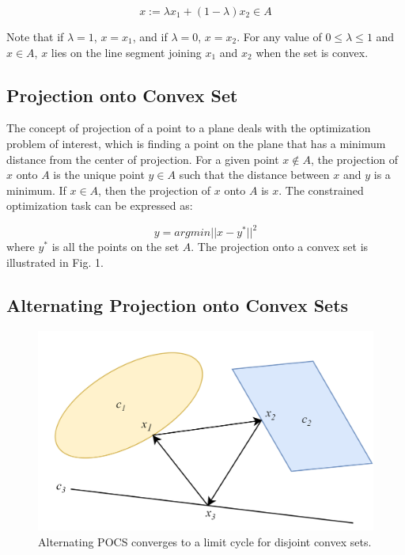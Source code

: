 \documentclass[conference]{IEEEtran}
\begin{document}
\begin{equation}
x := \lambda x_1 + (1 - \lambda)x_2 \in A  \label{eq1}
\end{equation}

Note that if $\lambda = 1$, $x = x_1$, and if $\lambda = 0$, $x = x_2$. For any value of $0 \leq \lambda \leq 1$ and $ x \in A $, $x$ lies on the line segment joining $x_1$ and $x_2$ when the set is convex.


\subsection{Projection onto Convex Set}
The concept of projection of a point to a plane deals with the optimization problem of interest, which is finding a point on the plane that has a minimum distance from the center of projection. For a given point $ x \notin A $, the projection of $x$ onto $A$ is the unique point $ y \in A $ such that the distance between $x$ and $y$ is a minimum. If $ x \in A $, then the projection of $x$ onto $A$ is $x$. The constrained optimization task can be expressed as:

\begin{equation}
y = argmin || x - y^* ||^2  \label{eq2}
\end{equation} where $y^*$ is all the points on the set $A$. The projection onto a convex set is illustrated in Fig. 1.


\subsection{Alternating Projection onto Convex Sets}

\begin{figure}[t]
\centering
\includegraphics[width=1.0\columnwidth]{figures/fig2_v3.png}
\caption{Alternating POCS converges to a limit cycle for disjoint convex sets.}
\end{figure}
\end{document}
